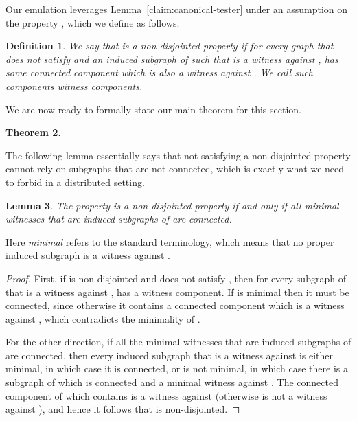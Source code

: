 \documentclass[11pt]{article}
\newtheorem{theorem}{Theorem}[section]
\newtheorem{lemma}[theorem]{Lemma}
\newtheorem{definition}[theorem]{Definition}
\begin{document}
Our emulation leverages Lemma~\ref{claim:canonical-tester} under an assumption on the property , which we define as follows.
\begin{definition}
We say that  is a \emph{non-disjointed} property if for every graph  that does not satisfy  and an induced subgraph  of  such that  is a witness against ,  has some connected component which is also a witness against . We call such components \emph{witness components}.
\end{definition}

We are now ready to formally state our main theorem for this section.

\begin{theorem}
\label{thm:sim}
\ThmSim
\end{theorem}


The following lemma essentially says that not satisfying a non-disjointed property cannot rely on subgraphs that are not connected, which is exactly what we need to forbid in a distributed setting.
\begin{lemma}
\label{lem:dist-prop-min}
The property  is a non-disjointed property if and only if all minimal
witnesses that are induced subgraphs of  are connected.
\end{lemma}
Here \emph{minimal} refers to the standard terminology, which means that no proper induced subgraph is a witness against .

\begin{proof}
First, if  is non-disjointed and  does not satisfy , then for
every subgraph  of  that is a witness against ,  has a
witness component. If  is minimal then it must be
connected, since otherwise it contains a connected component which is a
witness against , which contradicts the minimality of .

For the other direction, if all the minimal witnesses that are induced
subgraphs of  are connected, then every induced subgraph  that is a
witness against  is either minimal, in which case it is connected, or is
not minimal, in which case there is a subgraph  of  which is
connected and a minimal witness against . The connected component  of
 which contains  is a witness against  (otherwise  is not a
witness against ), and hence it follows that  is non-disjointed.
\end{proof}
\end{document}
